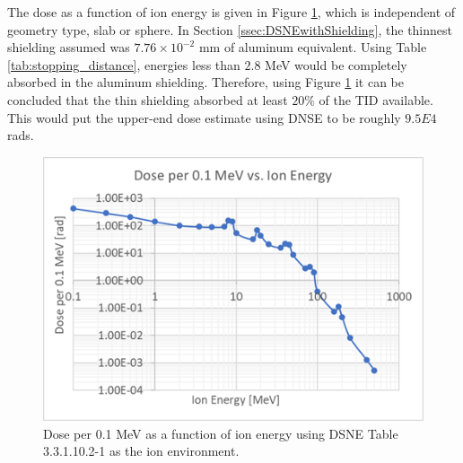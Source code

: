 \documentclass{hitec}
\begin{document}
The dose as a function of ion energy is given in Figure \ref{fig:Dose_vs_IonEnergy}, which is independent of geometry type, slab or sphere. In Section \ref{ssec:DSNEwithShielding}, the thinnest shielding assumed was $7.76\times 10^{-2}$ mm of aluminum equivalent. Using Table \ref{tab:stopping_distance}, energies less than $2.8$ MeV would be completely absorbed in the aluminum shielding. Therefore, using Figure \ref{fig:Dose_vs_IonEnergy} it can be concluded that the thin shielding absorbed at least $20\%$ of the TID available. This would put the upper-end dose estimate using DNSE to be roughly $9.5E4$ rads.

\begin{figure}[h!]
	\centering
	\includegraphics[scale=0.9]{Dose_vs_IonEnergy.png}
	\caption{Dose per 0.1 MeV as a function of ion energy using DSNE Table 3.3.1.10.2-1 as the ion environment.}\label{fig:Dose_vs_IonEnergy}
\end{figure}
\end{document}
